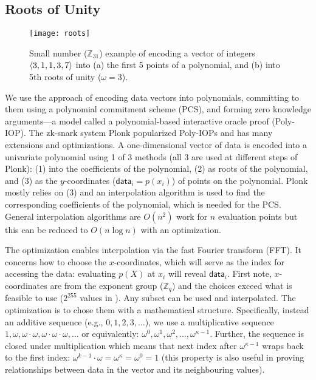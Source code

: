 \subsection{Roots of Unity}
\label{app:rou}

\begin{figure}
\centering
\texttt{[image: roots]}
\caption{Small number ($\mathbb{Z}_{31}$) example of encoding a vector of integers $\left \langle 3,1,1,3,7 \right \rangle$ into (a) the first 5 points of a polynomial, and (b) into 5th roots of unity ($\omega=3$).\label{fig:rou}}
\end{figure}

We use the approach of encoding data vectors into polynomials, committing to them using a polynomial commitment scheme (PCS), and forming zero knowledge arguments---a model called a polynomial-based interactive oracle proof (Poly-IOP). The zk-snark system Plonk popularized Poly-IOPs and has many extensions and optimizations. A one-dimensional vector of data is encoded into a univariate polynomial using 1 of 3 methods (all 3 are used at different steps of Plonk): (1) into the coefficients of the polynomial, (2) as roots of the polynomial, and (3) as the \(y\)-coordinates (\(\mathsf{data}_i=p(x_i)\)) of points on the polynomial. Plonk mostly relies on (3) and an interpolation algorithm is used to find the corresponding coefficients of the polynomial, which is
needed for the PCS. General interpolation algorithms are \(O(n^2)\) work for \(n\) evaluation points but this can be reduced to \(O(n\log n)\) with an optimization.

The optimization enables interpolation via the fast Fourier transform (FFT). It concerns how to choose the \(x\)-coordinates, which will serve as the index for accessing the data: evaluating \(p(X)\) at \(x_i\) will reveal \(\mathsf{data}_i\). First note, \(x\)-coordinates are from the exponent group (\(\mathbb{Z}_q\)) and the choices exceed what is feasible to use (\(2^{255}\) values in \bls). Any subset can be used and interpolated. The optimization is to chose them with a mathematical structure. Specifically, instead an additive sequence (e.g., \(0,1,2,3,\ldots\)), we use a multiplicative sequence
\(1,\omega,\omega\cdot\omega,\omega\cdot\omega\cdot\omega,\ldots\) or equivalently: \(\omega^0,\omega^1,\omega^2,\ldots,\omega^{\kappa-1}\). Further, the sequence is closed under multiplication which means that next index after \(\omega^{\kappa-1}\) wraps back to the first index: \(\omega^{k-1} \cdot \omega = \omega^\kappa = \omega^0=1\) (this property is also useful in proving relationships between data in the vector and its neighbouring values).

